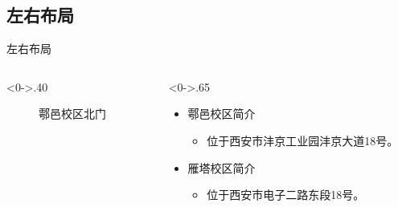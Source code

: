 \documentclass[10pt,aspectratio=43,mathserif,table]{beamer}
\begin{document}
\subsection{左右布局}
\begin{frame}{左右布局}
\begin{columns}[T] %
\begin{column}<0->{.40\textwidth}
	\begin{figure}[thpb]
		\centering
		\caption{鄠邑校区北门}
		\label{fig:campus}
	\end{figure}
\end{column}%
\hfill%
\begin{column}<0->{.65\textwidth}
	\begin{itemize}
		\item<1-> 鄠邑校区简介
		\begin{itemize}
			\item<1-> 位于西安市沣京工业园沣京大道18号。
		\end{itemize}
		\item<2-> 雁塔校区简介
		\begin{itemize}
			\item<2-> 位于西安市电子二路东段18号。
		\end{itemize}
	\end{itemize}
\end{column}%
\end{columns}
\end{frame}
\end{document}
